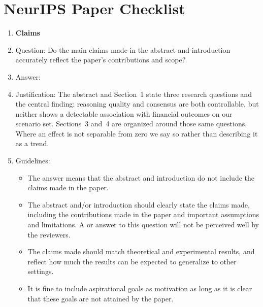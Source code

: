 \section*{NeurIPS Paper Checklist}

\begin{enumerate}

\item {\bf Claims}
    \item[] Question: Do the main claims made in the abstract and introduction accurately reflect the paper's contributions and scope?
    \item[] Answer: \answerYes{}
    \item[] Justification: The abstract and Section~1 state three research questions and the central finding: reasoning quality and consensus are both controllable, but neither shows a detectable association with financial outcomes on our scenario set. Sections~3 and~4 are organized around those same questions. Where an effect is not separable from zero we say so rather than describing it as a trend.
    \item[] Guidelines:
    \begin{itemize}
        \item The answer \answerNA{} means that the abstract and introduction do not include the claims made in the paper.
        \item The abstract and/or introduction should clearly state the claims made, including the contributions made in the paper and important assumptions and limitations. A \answerNo{} or \answerNA{} answer to this question will not be perceived well by the reviewers.
        \item The claims made should match theoretical and experimental results, and reflect how much the results can be expected to generalize to other settings.
        \item It is fine to include aspirational goals as motivation as long as it is clear that these goals are not attained by the paper.
    \end{itemize}


\end{enumerate}
